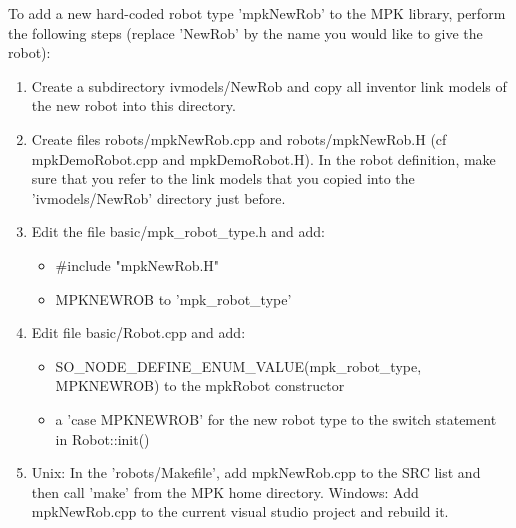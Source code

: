 \documentclass[letter,12pt]{article}
\begin{document}
To add a new hard-coded robot type 'mpkNewRob' to the MPK library,
perform the following steps (replace 'NewRob' by the name you would
like to give the robot):

\begin{enumerate}
  
\item Create a subdirectory ivmodels/NewRob and copy all inventor link
  models of the new robot into this directory.
 
\item Create files robots/mpkNewRob.cpp and robots/mpkNewRob.H (cf
  mpkDemoRobot.cpp and mpkDemoRobot.H).  In the robot definition, make
  sure that you refer to the link models that you copied into the
  'ivmodels/NewRob' directory just before.

\item Edit the file basic/mpk\_robot\_type.h and add:
  \begin{itemize}
  \item \#include "mpkNewRob.H"
  \item MPKNEWROB to 'mpk\_robot\_type'
  \end{itemize}
 
\item Edit file basic/Robot.cpp and add:
\begin{itemize}
\item SO\_NODE\_DEFINE\_ENUM\_VALUE(mpk\_robot\_type, MPKNEWROB) to
  the mpkRobot constructor
\item a 'case MPKNEWROB' for the new robot type to the switch
  statement in Robot::init()
\end{itemize}
 
\item Unix: In the 'robots/Makefile', add mpkNewRob.cpp to the SRC
  list and then call 'make' from the MPK home directory.  Windows: Add
  mpkNewRob.cpp to the current visual studio project and rebuild it.
  
\end{enumerate}
\end{document}
